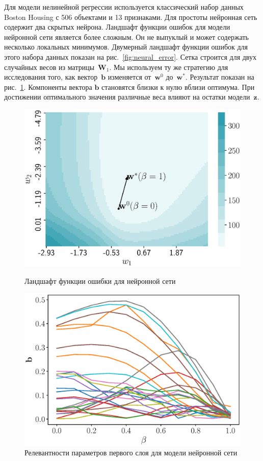 \documentclass[a4paper,12pt]{article}
\theoremstyle{plain} %
\theoremstyle{definition} %
\theoremstyle{remark} %
\newcommand{\bb}{\mathbf{b}}
\newcommand{\bw}{\mathbf{w}}
\newcommand{\bz}{\mathbf{z}}
\newcommand{\bW}{\mathbf{W}}
\begin{document}
	Для модели нелинейной регрессии используется классический набор данных Boston Housing с 506 объектами и 13 признаками.
	Для простоты нейронная сеть содержит два скрытых нейрона.
	Ландшафт функции ошибок для модели нейронной сети является более сложным. 
	Он не выпуклый и может содержать несколько локальных минимумов.
	Двумерный ландшафт функции ошибок для этого набора данных показан на рис.~\ref{fig:neural_error}. 
	Сетка строится для двух случайных весов из матрицы~$\bW_1$.
	Мы используем ту же стратегию для исследования того, как вектор~$\bb$ изменяется от~$\bw^0$ до~$\bw^*$. 
	Результат показан на рис.~\ref{fig:neural_b_wrt_beta}.
	Компоненты вектора $\bb$ становятся близки к нулю вблизи оптимума. 
	При достижении оптимального значения различные веса влияют на остатки модели~$\bz$.
	\begin{figure}
		\centering
		\begin{minipage}{.5\textwidth}
			\centering
			\includegraphics[width=\linewidth]{figs/neural_error}
			\caption{Ландшафт функции ошибки для нейронной сети}
			\label{fig:neural_error}
		\end{minipage}%
		\begin{minipage}{.5\textwidth}
			\centering
			\includegraphics[width=\linewidth]{figs/neural_b_wrt_beta}
			\caption{Релевантности параметров первого слоя для модели нейронной сети}
			\label{fig:neural_b_wrt_beta}
		\end{minipage}
	\end{figure}
\end{document}
